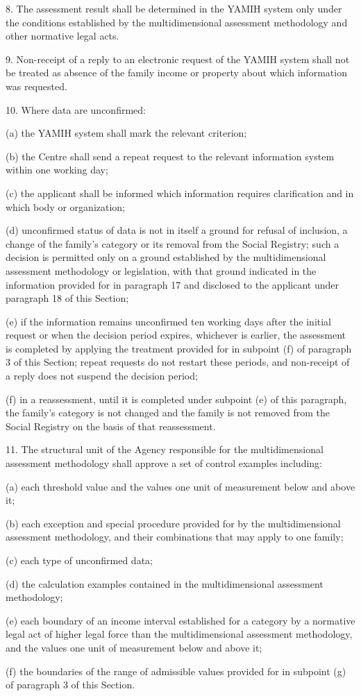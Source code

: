 \documentclass[14pt,a4paper]{extarticle}
\newcommand{\norm}[1]{\par\noindent\hspace*{1.27cm}#1. }
\newcommand{\sub}[1]{\par\noindent\hspace*{1.27cm}#1 }
\begin{document}
\norm{8}The assessment result shall be determined in the YAMIH system only under the conditions established by the multidimensional assessment methodology and other normative legal acts.

\norm{9}Non-receipt of a reply to an electronic request of the YAMIH system shall not be treated as absence of the family income or property about which information was requested.

\norm{10}Where data are unconfirmed:
\sub{(a)}the YAMIH system shall mark the relevant criterion;
\sub{(b)}the Centre shall send a repeat request to the relevant information system within one working day;
\sub{(c)}the applicant shall be informed which information requires clarification and in which body or organization;
\sub{(d)}unconfirmed status of data is not in itself a ground for refusal of inclusion, a change of the family’s category or its removal from the Social Registry; such a decision is permitted only on a ground established by the multidimensional assessment methodology or legislation, with that ground indicated in the information provided for in paragraph 17 and disclosed to the applicant under paragraph 18 of this Section;
\sub{(e)}if the information remains unconfirmed ten working days after the initial request or when the decision period expires, whichever is earlier, the assessment is completed by applying the treatment provided for in subpoint (f) of paragraph 3 of this Section; repeat requests do not restart these periods, and non-receipt of a reply does not suspend the decision period;
\sub{(f)}in a reassessment, until it is completed under subpoint (e) of this paragraph, the family’s category is not changed and the family is not removed from the Social Registry on the basis of that reassessment.

\norm{11}The structural unit of the Agency responsible for the multidimensional assessment methodology shall approve a set of control examples including:
\sub{(a)}each threshold value and the values one unit of measurement below and above it;
\sub{(b)}each exception and special procedure provided for by the multidimensional assessment methodology, and their combinations that may apply to one family;
\sub{(c)}each type of unconfirmed data;
\sub{(d)}the calculation examples contained in the multidimensional assessment methodology;
\sub{(e)}each boundary of an income interval established for a category by a normative legal act of higher legal force than the multidimensional assessment methodology, and the values one unit of measurement below and above it;
\sub{(f)}the boundaries of the range of admissible values provided for in subpoint (g) of paragraph 3 of this Section.
\end{document}

